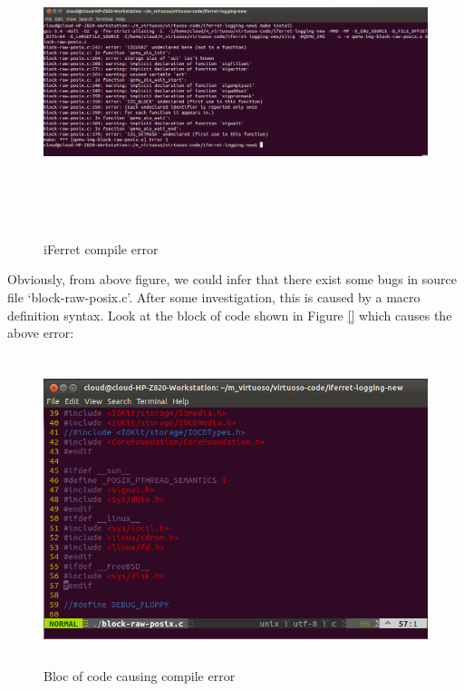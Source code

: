 \begin{figure}[htbp]
	\centering
		\includegraphics[width=14cm, height= 9cm ]{Figures/Figure33.png}
	\caption[iFerret compile error]{iFerret compile error}
	\label{fig:iFerret compile error}
\end{figure}

Obviously, from above figure, we could infer that there exist some bugs in source file ‘block-raw-posix.c’. After some investigation, 
this is caused by a macro definition syntax. Look at the block of code shown in Figure \ref{} which causes the above error:

\begin{figure}[htbp]
	\centering
		\includegraphics[width=14cm, height= 9cm ]{Figures/Figure34.png}
	\caption[Bloc of code causing compile error]{Bloc of code causing compile error}
	\label{fig:Bloc of code causing compile error}
\end{figure}


